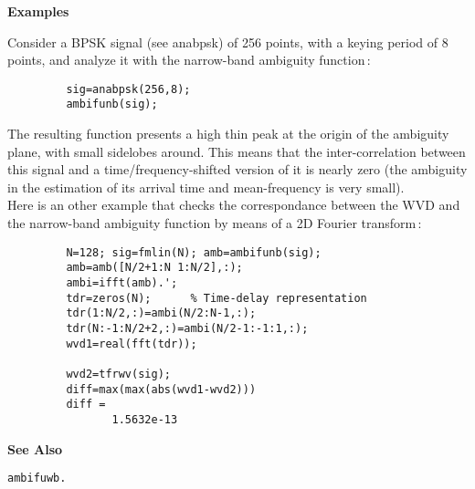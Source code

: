 {\bf \large {}\selectfont Examples}\\
\hspace*{1.5cm}
\begin{minipage}[t]{13.5cm}
Consider a BPSK signal (see {\ty anabpsk}) of 256 points, with a keying
period of 8 points, and analyze it with the narrow-band ambiguity
function\,:
\begin{verbatim}
         sig=anabpsk(256,8);
         ambifunb(sig);
\end{verbatim}
The resulting function presents a high thin peak at the origin of the
ambiguity plane, with small sidelobes around. This means that the
inter-correlation between this signal and a time/frequency-shifted version
of it is nearly zero (the ambiguity in the estimation of its arrival time
and mean-frequency is very small).\\

Here is an other example that checks the correspondance between the WVD and
the narrow-band ambiguity function by means of a 2D Fourier transform\,:
\begin{verbatim}
         N=128; sig=fmlin(N); amb=ambifunb(sig);
         amb=amb([N/2+1:N 1:N/2],:);
         ambi=ifft(amb).';
         tdr=zeros(N); 		% Time-delay representation
         tdr(1:N/2,:)=ambi(N/2:N-1,:);
         tdr(N:-1:N/2+2,:)=ambi(N/2-1:-1:1,:);
         wvd1=real(fft(tdr));

         wvd2=tfrwv(sig);
         diff=max(max(abs(wvd1-wvd2)))
         diff = 
                1.5632e-13
\end{verbatim}
\end{minipage}
\vspace*{.5cm}


{\bf \large {}\selectfont See Also}\\
\hspace*{1.5cm}
\begin{minipage}[t]{13.5cm}
\begin{verbatim}
ambifuwb.
\end{verbatim}
\end{minipage}

